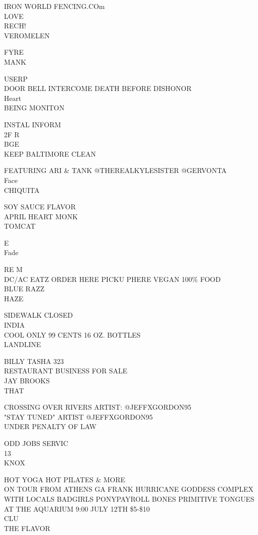\documentclass[10pt,letterpaper]{article}
\begin{document}
IRON WORLD FENCING.COm\\
LOVE\\
RECH!\\
VEROMELEN

FYRE\\
MANK

USERP\\
DOOR BELL INTERCOME DEATH BEFORE DISHONOR\\
Heart\\
BEING MONITON

INSTAL INFORM\\
2F R\\
BGE\\
KEEP BALTIMORE CLEAN

FEATURING ARI \& TANK @THEREALKYLESISTER @GERVONTA\\
Face\\
CHIQUITA

SOY SAUCE FLAVOR\\
APRIL HEART MONK\\
TOMCAT

E\\
Fade

RE M\\
DC/AC EATZ ORDER HERE PICKU PHERE VEGAN 100\% FOOD\\
BLUE RAZZ\\
HAZE

SIDEWALK CLOSED\\
INDIA\\
COOL ONLY 99 CENTS 16 OZ. BOTTLES\\
LANDLINE

BILLY TASHA 323\\
RESTAURANT BUSINESS FOR SALE\\
JAY BROOKS\\
THAT

CROSSING OVER RIVERS ARTIST: @JEFFXGORDON95\\
"STAY TUNED" ARTIST @JEFFXGORDON95\\
UNDER PENALTY OF LAW

ODD JOBS SERVIC\\
13\\
KNOX

HOT YOGA HOT PILATES \& MORE\\
ON TOUR FROM ATHENS GA FRANK HURRICANE GODDESS COMPLEX WITH LOCALS BADGIRLS PONYPAYROLL BONES PRIMITIVE TONGUES AT THE AQUARIUM 9:00 JULY 12TH \$5{-}\$10\\
CLU\\
THE FLAVOR
\end{document}
